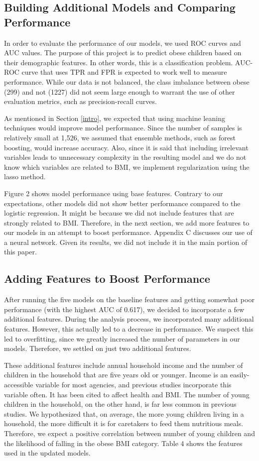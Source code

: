 \documentclass[twoside,11pt]{article}
\begin{document}
\subsection{Building Additional Models and Comparing Performance} \label{more_models}
In order to evaluate the performance of our models, we used ROC curves and AUC values. The purpose of this project is to predict obese children based on their demographic features. In other words, this is a classification problem. AUC-ROC curve that uses TPR and FPR is expected to work well to measure performance. While our data is not balanced, the class imbalance between obese (299) and not (1227) did not seem large enough to warrant the use of other evaluation metrics, such as precision-recall curves. 

As mentioned in Section \ref{intro}, we expected that using machine leaning techniques would improve model performance. Since the number of samples is relatively small at 1,526, we assumed that ensemble methods, such as forest boosting, would increase accuracy. Also, since it is said that including irrelevant variables leads to unnecessary complexity in the resulting model and we do not know which variables are related to BMI, we implement regularization using the lasso method.

Figure 2 shows model performance using base features. Contrary to our expectations, other models did not show better performance compared to the logistic regression. It might be because we did not include features that are strongly related to BMI. Therefore, in the next section, we add more features to our models in an attempt to boost performance. Appendix C discusses our use of a neural network. Given its results, we did not include it in the main portion of this paper. 

\subsection{Adding Features to Boost Performance} \label{more_features}
After running the five models on the baseline features and getting somewhat poor performance (with the highest AUC of 0.617), we decided to incorporate a few additional features. During the analysis process, we incorporated many additional features. However, this actually led to a decrease in performance. We suspect this led to overfitting, since we greatly increased the number of parameters in our models. Therefore, we settled on just two additional features. 

These additional features include annual household income and the number of children in the household that are five years old or younger. Income is an easily-accessible variable for most agencies, and previous studies incorporate this variable often. It has been cited to affect health and BMI. The number of young children in the household, on the other hand, is far less common in previous studies. We hypothesized that, on average, the more young children living in a household, the more difficult it is for caretakers to feed them nutritious meals. Therefore, we expect a positive correlation between number of young children and the likelihood of falling in the obese BMI category. Table 4 shows the features used in the updated models. 
\end{document}
